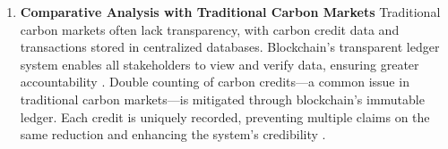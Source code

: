 \documentclass[preprint,12pt]{elsarticle}
\begin{document}
\begin{enumerate}
\begin{enumerate}
    \end{enumerate}
    \item \textbf{Comparative Analysis with Traditional Carbon Markets}
    Traditional carbon markets often lack transparency, with carbon credit data and transactions stored in centralized databases. Blockchain’s transparent ledger system enables all stakeholders to view and verify data, ensuring greater accountability \citep{adams2018blockchain}. Double counting of carbon credits—a common issue in traditional carbon markets—is mitigated through blockchain’s immutable ledger. Each credit is uniquely recorded, preventing multiple claims on the same reduction and enhancing the system’s credibility \citep{wong2019blockchain}.
\end{enumerate}
\end{document}
